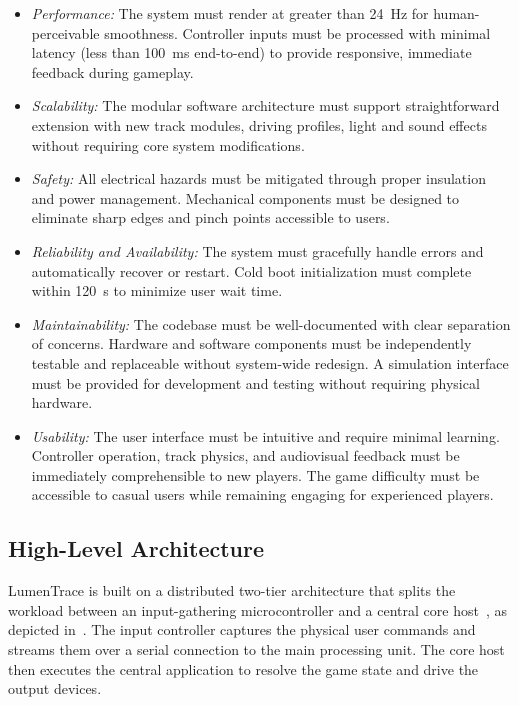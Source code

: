 \documentclass[10pt,journal,final,a4paper]{IEEEtran}
\begin{document}
\begin{itemize}
    \item \textit{Performance:}
    The system must render at greater than \SI{24}{\hertz} for human-perceivable smoothness. Controller inputs must be processed with minimal latency (less than \SI{100}{\milli\second} end-to-end) to provide responsive, immediate feedback during gameplay.
    
    \item \textit{Scalability:}
    The modular software architecture must support straightforward extension with new track modules, driving profiles, light and sound effects without requiring core system modifications.
    
    \item \textit{Safety:}
    All electrical hazards must be mitigated through proper insulation and power management. Mechanical components must be designed to eliminate sharp edges and pinch points accessible to users.
    
    \item \textit{Reliability and Availability:}
    The system must gracefully handle errors and automatically recover or restart. Cold boot initialization must complete within \SI{120}{\second} to minimize user wait time.
    
    \item \textit{Maintainability:}
    The codebase must be well-documented with clear separation of concerns. Hardware and software components must be independently testable and replaceable without system-wide redesign. A simulation interface must be provided for development and testing without requiring physical hardware.
    
    \item \textit{Usability:}
    The user interface must be intuitive and require minimal learning. Controller operation, track physics, and audiovisual feedback must be immediately comprehensible to new players. The game difficulty must be accessible to casual users while remaining engaging for experienced players.
\end{itemize}

\subsection{High-Level Architecture}
\label{subsec:high-level-architecture}

LumenTrace is built on a distributed two-tier architecture that splits the workload between an input-gathering microcontroller and a central core host~\cite{magpi:2024raspberry}, as depicted in~. The input controller captures the physical user commands and streams them over a serial connection to the main processing unit. The core host then executes the central application to resolve the game state and drive the output devices.
\end{document}
